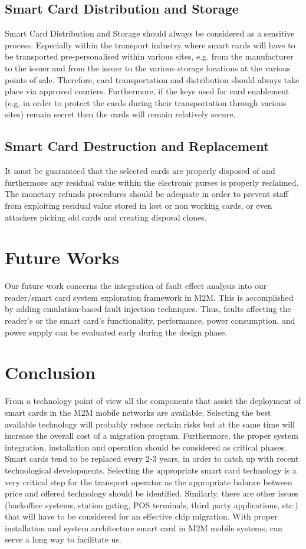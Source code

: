 \documentclass[12pt]{article}
\begin{document}
\subsection{Smart Card Distribution and Storage}
Smart Card Distribution and Storage should
always be considered as a sensitive process. Especially
within the transport industry where smart cards will
have to be transported pre-personalised within various
sites, e.g. from the manufacturer to the issuer and from
the issuer to the various storage locations at the various
points of sale. Therefore, card transportation and
distribution should always take place via approved
couriers.
Furthermore, if the keys used for card enablement (e.g.
in order to protect the cards during their transportation
through various sites) remain secret then the cards will
remain relatively secure.

\subsection{Smart Card Destruction and Replacement}
It must be guaranteed that the
selected cards are properly disposed of and furthermore
any residual value within the electronic purses is
properly reclaimed. The monetary refunds procedures
should be adequate in order to prevent staff from
exploiting residual value stored in lost or non working
cards, or even attackers picking old cards and creating
disposal clones.


\section{Future Works}
Our future work concerns the integration of fault effect
analysis into our reader/smart card system exploration framework in M2M.
This is accomplished by adding emulation-based fault
injection techniques. Thus, faults affecting the reader's or the
smart card's functionality, performance, power consumption,
and power supply can be evaluated early during the design
phase.


\section{Conclusion}
From a technology point of view all the components
that assist the deployment of smart cards in the
M2M mobile networks are available. Selecting the best
available technology will probably reduce certain risks
but at the same time will increase the overall cost of a
migration program. Furthermore, the proper system
integration, installation and operation should be
considered as critical phases.
\newline
Smart cards tend to be replaced every 2-3 years, in order to catch up with
recent technological developments. Selecting the
appropriate smart card technology is a very critical step
for the transport operator as the appropriate balance
between price and offered technology should be
identified. Similarly, there are other issues (backoffice
systems, station gating, POS terminals, third
party applications, etc.) that will have to be considered
for an effective chip migration. With proper installation and system architecture smart card in M2M mobile systems, can serve a long way to facilitate us.
\end{document}
